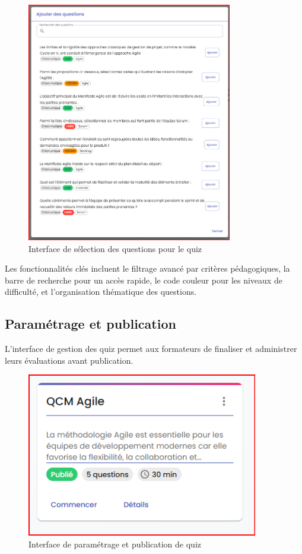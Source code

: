 \documentclass[12pt,a4paper]{report}
\begin{document}
\begin{figure}[H]
\centering
\includegraphics[width=0.8\textwidth]{latex_media/media/image57.png}
\caption{Interface de sélection des questions pour le quiz}
\label{fig:selection-questions}
\end{figure}

Les fonctionnalités clés incluent le filtrage avancé par critères pédagogiques, la barre de recherche pour un accès rapide, le code couleur pour les niveaux de difficulté, et l'organisation thématique des questions.

\subsection{Paramétrage et publication}

L'interface de gestion des quiz permet aux formateurs de finaliser et administrer leurs évaluations avant publication.

\begin{figure}[H]
\centering
\includegraphics[width=0.9\textwidth]{latex_media/media/image58.png}
\caption{Interface de paramétrage et publication de quiz}
\label{fig:parametrage-quiz}
\end{figure}
\end{document}
